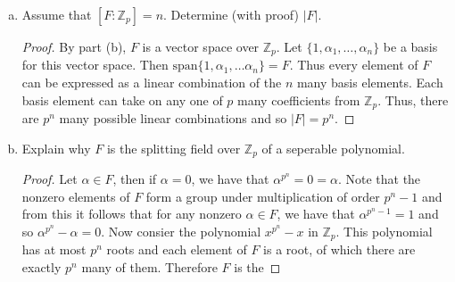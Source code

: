 \documentclass[12pt]{article}
\begin{document}
\begin{enumerate}
\begin{enumerate}[(a)]
\begin{proof}
                        Then we have that
                        \begin{align*}
                            m\alpha\in F \\(m+n)\alpha = m\alpha+n\alpha \\
                            (\alpha+\beta)m=m\alpha+m\beta.
                        \end{align*}
                        This coupled with the facts that $F$ is an abelian
                        additive group shows that $F$ is a vector space over
                        $\mathbb{Z}_p$. 
                    \end{proof}
                \item Assume that $[F:\mathbb{Z}_p]=n$. Determine (with proof)
                    $|F|$. 
                    \begin{proof}
                        By part (b), $F$ is a vector space over $\mathbb{Z}_p$.
                        Let $\{1, \alpha_1, \dots, \alpha_n\}$ be a basis for
                        this vector space. Then $\text{span}\{1, \alpha_1,
                        \dots\alpha_n\}=F$. Thus every element of $F$ can be
                        expressed as a linear combination of the $n$ many basis
                        elements. Each basis element can take on any one of $p$
                        many coefficients from $\mathbb{Z}_p$. Thus, there are
                        $p^n$ many possible linear combinations and so
                        $|F|=p^n$. 
                    \end{proof}
                \item Explain why $F$ is the splitting field over
                    $\mathbb{Z}_p$ of a seperable polynomial. 
                    \begin{proof}
                        Let $\alpha\in F$, then if $\alpha=0$, we have that
                        $\alpha^{p^n}=0=\alpha$. Note that the nonzero elements
                        of $F$ form a group under multiplication of order
                        $p^n-1$ and from this
                        it follows that for any nonzero $\alpha\in F$, we have
                        that $\alpha^{p^n-1}=1$ and so $\alpha^{p^n}-\alpha=0$.
                        Now consier the polynomial $x^{p^n}-x$ in
                        $\mathbb{Z}_p$. This polynomial has at most $p^n$ roots
                        and each element of $F$ is a root, of which there are
                        exactly $p^n$ many of them. Therefore $F$ is the

\end{proof}
\end{enumerate}
\end{enumerate}
\end{document}
